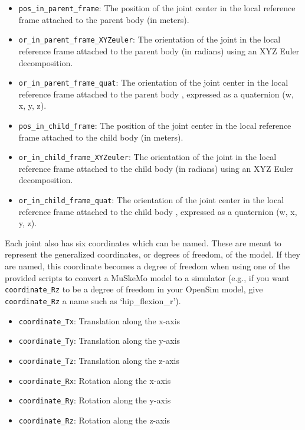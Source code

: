 \documentclass{article}
\begin{document}
\begin{itemize}
    \item \texttt{pos\_in\_parent\_frame}: The position of the joint center in the local reference frame attached to the parent body (in meters).
    \item \texttt{or\_in\_parent\_frame\_XYZeuler}: The orientation of the joint in the local reference frame attached to the parent body (in radians) using an XYZ Euler decomposition.
    \item \texttt{or\_in\_parent\_frame\_quat}: The orientation of the joint center in the local reference frame attached to the parent body , expressed as a quaternion (w, x, y, z).
    \item \texttt{pos\_in\_child\_frame}: The position of the joint center in the local reference frame attached to the child body (in meters).
    \item \texttt{or\_in\_child\_frame\_XYZeuler}: The orientation of the joint in the local reference frame attached to the child body (in radians) using an XYZ Euler decomposition.
    \item \texttt{or\_in\_child\_frame\_quat}: The orientation of the joint center in the local reference frame attached to the child body , expressed as a quaternion (w, x, y, z).
\end{itemize}

Each joint also has six coordinates which can be named. These are meant to represent the generalized coordinates, or degrees of freedom, of the model. If they are named, this coordinate becomes a degree of freedom when using one of the provided scripts to convert a MuSkeMo model to a simulator (e.g., if you want \texttt{coordinate\_Rz} to be a degree of freedom in your OpenSim model, give \texttt{coordinate\_Rz} a name such as ‘hip\_flexion\_r').

\begin{itemize}
    \item \texttt{coordinate\_Tx}: Translation along the x-axis
    \item \texttt{coordinate\_Ty}: Translation along the y-axis
    \item \texttt{coordinate\_Tz}: Translation along the z-axis
    \item \texttt{coordinate\_Rx}: Rotation along the x-axis
    \item \texttt{coordinate\_Ry}: Rotation along the y-axis
    \item \texttt{coordinate\_Rz}: Rotation along the  z-axis
\end{itemize}
\end{document}
